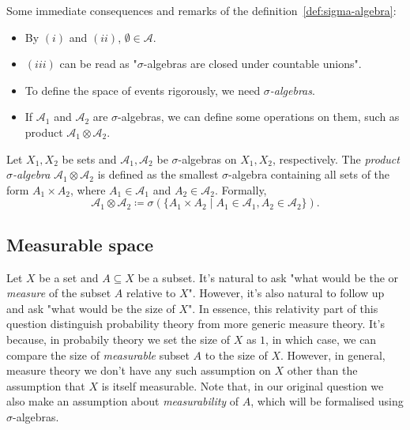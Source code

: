\begin{notenl}
    Some immediate consequences and remarks of the definition~\ref{def:sigma-algebra}:
    \begin{itemize}
        \item By $(i)$ and $(ii)$, $\emptyset \in \mathcal{A}$.
        \item  $(iii)$ can be read as "$\sigma$-algebras are closed under countable unions".
        \item To define the space of events rigorously, we need \textit{$\sigma$-algebras}.
        \item If $\mathcal{A}_1$ and $\mathcal{A}_2$ are $\sigma$-algebras, we can define some operations on them, such as product $\mathcal{A}_1 \otimes \mathcal{A}_2$.
    \end{itemize}
\end{notenl}

\begin{definition}
    Let $X_1, X_2$ be sets and $\mathcal{A}_1, \mathcal{A}_2$ be $\sigma$-algebras on $X_1, X_2$, respectively. The \emph{product $\sigma$-algebra} $\mathcal{A}_1 \otimes \mathcal{A}_2$ is defined as the smallest $\sigma$-algebra containing all sets of the form $A_1 \times A_2$, where $A_1 \in \mathcal{A}_1$ and $A_2 \in \mathcal{A}_2$. Formally,
    \[
        \mathcal{A}_1 \otimes \mathcal{A}_2 \coloneq \sigma\left(\{A_1 \times A_2 \mid A_1 \in \mathcal{A}_1, A_2 \in \mathcal{A}_2\}\right).
    \]
\end{definition}

\subsection{Measurable space}

Let $X$ be a set and $A \subseteq X$ be a subset. It's natural to ask "what would be the  or \textit{measure} of the subset $A$ relative to $X$". However, it's also natural to follow up and ask "what would be the size of $X$". In essence, this relativity part of this question distinguish probability theory from more generic measure theory. It's because, in probabily theory we set the size of $X$ as $1$, in which case, we can compare the size of \textit{measurable} subset $A$ to the size of $X$. However, in general, measure theory we don't have any such assumption on $X$ other than the assumption that $X$ is itself measurable. Note that, in our original question we also make an assumption about \textit{measurability} of $A$, which will be formalised using $\sigma$-algebras.


